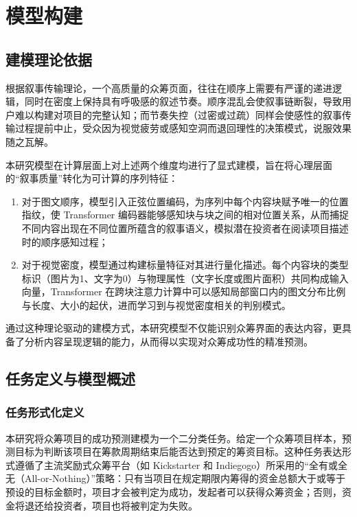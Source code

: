 \newpage
\setcounter{table}{0}
\setcounter{figure}{0}
\section{模型构建}
\subsection{建模理论依据}
根据叙事传输理论，一个高质量的众筹页面，往往在顺序上需要有严谨的递进逻辑，同时在密度上保持具有呼吸感的叙述节奏。顺序混乱会使叙事链断裂，导致用户难以构建对项目的完整认知；而节奏失控（过密或过疏）同样会使感性的叙事传输过程提前中止，受众因为视觉疲劳或感知空洞而退回理性的决策模式，说服效果随之瓦解。

本研究模型在计算层面上对上述两个维度均进行了显式建模，旨在将心理层面的“叙事质量”转化为可计算的序列特征：

\begin{enumerate}[label=(\arabic*)]
  \item 对于图文顺序，模型引入正弦位置编码，为序列中每个内容块赋予唯一的位置指纹，使 Transformer 编码器能够感知块与块之间的相对位置关系，从而捕捉不同内容出现在不同位置所蕴含的叙事语义，模拟潜在投资者在阅读项目描述时的顺序感知过程；
  \item 对于视觉密度，模型通过构建标量特征对其进行量化描述。每个内容块的类型标识（图片为1、文字为0）与物理属性（文字长度或图片面积）共同构成输入向量，Transformer 在跨块注意力计算中可以感知局部窗口内的图文分布比例与长度、大小的起伏，进而学习到与视觉密度相关的判别模式。
\end{enumerate}

通过这种理论驱动的建模方式，本研究模型不仅能识别众筹界面的表达内容，更具备了分析内容呈现逻辑的能力，从而得以实现对众筹成功性的精准预测。

\subsection{任务定义与模型概述}
\subsubsection{任务形式化定义}
本研究将众筹项目的成功预测建模为一个二分类任务。给定一个众筹项目样本，预测目标为判断该项目在筹款周期结束后能否达到预定的筹资目标。这种任务表达形式遵循了主流奖励式众筹平台（如 Kickstarter 和 Indiegogo）所采用的“全有或全无（All-or-Nothing）”策略：只有当项目在规定期限内筹得的资金总额大于或等于预设的目标金额时，项目才会被判定为成功，发起者可以获得众筹资金；否则，资金将退还给投资者，项目也将被判定为失败。

